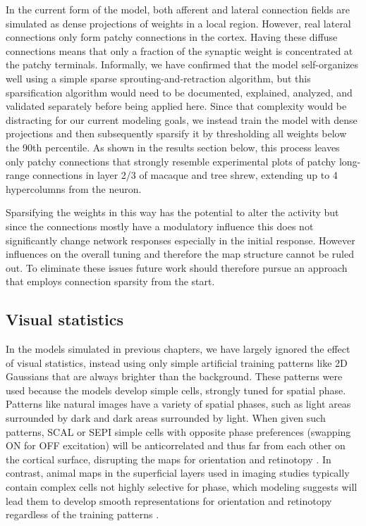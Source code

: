 In the current form of the model, both afferent and lateral connection
fields are simulated as dense projections of weights in a local
region. However, real lateral connections only form patchy connections
in the cortex. Having these diffuse connections means that only a
fraction of the synaptic weight is concentrated at the patchy
terminals. Informally, we have confirmed that the model self-organizes
well using a simple sparse sprouting-and-retraction algorithm, but
this sparsification algorithm would need to be documented, explained,
analyzed, and validated separately before being applied here. Since
that complexity would be distracting for our current modeling goals,
we instead train the model with dense projections and then
subsequently sparsify it by thresholding all weights below the 90th
percentile. As shown in the results section below, this process leaves
only patchy connections that strongly resemble experimental plots of
patchy long-range connections in layer 2/3 of macaque and tree shrew,
extending up to 4 hypercolumns from the neuron.

Sparsifying the weights in this way has the potential to alter the
activity but since the connections mostly have a modulatory influence
this does not significantly change network responses especially in the
initial response. However influences on the overall tuning and
therefore the map structure cannot be ruled out. To eliminate these
issues future work should therefore pursue an approach that employs
connection sparsity from the start.

\subsection{Visual statistics}

In the models simulated in previous chapters, we have largely ignored
the effect of visual statistics, instead using only simple artificial
training patterns like 2D Gaussians that are always brighter than the
background.  These patterns were used because the models develop
simple cells, strongly tuned for spatial phase.  Patterns like natural
images have a variety of spatial phases, such as light areas
surrounded by dark and dark areas surrounded by light.  When given
such patterns, SCAL or SEPI simple cells with opposite phase
preferences (swapping ON for OFF excitation) will be anticorrelated
and thus far from each other on the cortical surface, disrupting the
maps for orientation and retinotopy \citep{Miikkulainen2005}.  In
contrast, animal maps in the superficial layers used in imaging
studies typically contain complex cells not highly selective for
phase, which modeling suggests will lead them to develop smooth
representations for orientation and retinotopy regardless of the
training patterns \citep{Antolik2010}.

